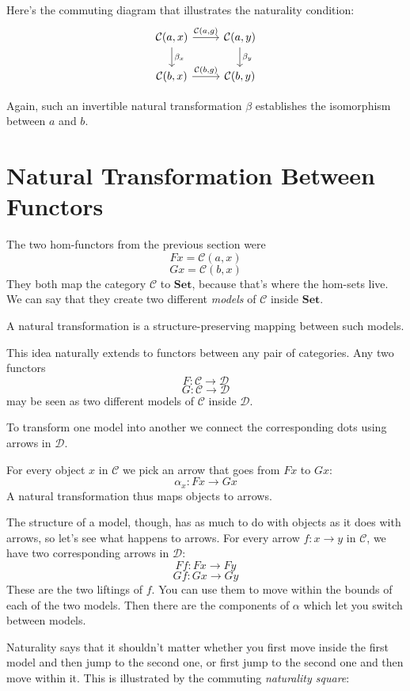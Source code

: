 \documentclass[DaoFP]{subfiles}
\begin{document}
Here's the commuting diagram that illustrates the naturality condition:
\[
 \begin{tikzcd}
 \mathcal{C}(a, x)
 \arrow[d, "\beta_x"]
 \arrow[r, "{\mathcal{C}(a, g)}"]
 &
 \mathcal{C}(a, y)
  \arrow[d, "\beta_y"]
 \\
 \mathcal{C}(b, x)
 \arrow[r, "{\mathcal{C}(b, g)}"]
& \mathcal{C}(b, y)
 \end{tikzcd}
\]

Again, such an invertible natural transformation $\beta$ establishes the isomorphism between $a$ and $b$.

\section{Natural Transformation Between Functors}

The two hom-functors from the previous section were
\[ F x =   \mathcal{C}(a, x)\]
\[ G x =   \mathcal{C}(b, x)\]
They both map the category $\mathcal{C}$ to  $\mathbf{Set}$, because that's where the hom-sets live. We can say that they create two different \emph{models} of $\mathcal{C}$ inside $\mathbf{Set}$. 

A natural transformation is a structure-preserving mapping between such models. 

This idea naturally extends to functors between any pair of categories. Any two functors
\[ F \colon \mathcal{C} \to \mathcal{D} \]
\[ G \colon \mathcal{C} \to \mathcal{D} \]
may be seen as two different models of $\mathcal{C}$ inside $\mathcal{D}$. 

To transform one model into another we connect the corresponding dots using arrows in $\mathcal{D}$. 

For every object $x$ in $\mathcal{C}$ we pick an arrow that goes from $F x$ to $G x$:
\[ \alpha_x \colon F x \to G x \]
A natural transformation thus maps objects to arrows.

The structure of a model, though, has as much to do with objects as it does with arrows, so let's see what happens to arrows. For every arrow $f \colon x \to y$ in $\mathcal{C}$, we have two corresponding arrows in $\mathcal{D}$:
\[ F f \colon F x \to F y\]
\[ G f \colon G x \to G y \]
These are the two liftings of $f$. You can use them to move within the bounds of each of the two models. Then there are the components of $\alpha$ which let you switch between models. 

Naturality says that it shouldn't matter whether you first move inside the first model and then jump to the second one, or first jump to the second one and then move within it. This is illustrated by the commuting \emph{naturality square}:
\end{document}
